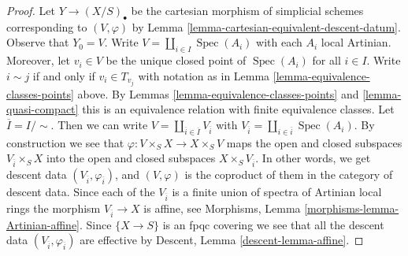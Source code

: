 \documentclass{stacks-project}
\theoremstyle{plain}
\theoremstyle{definition}
\theoremstyle{remark}
\numberwithin{equation}{subsection}
\def\Spec{\mathop{\mathrm{Spec}}}
\begin{document}
\begin{proof}
Let $Y \to (X/S)_\bullet$ be the cartesian morphism of simplicial
schemes corresponding to $(V, \varphi)$ by
Lemma \ref{lemma-cartesian-equivalent-descent-datum}.
Observe that $Y_0 = V$.
Write $V = \coprod_{i \in I} \Spec(A_i)$ with each $A_i$ local
Artinian. Moreover, let $v_i \in V$ be the unique closed point of
$\Spec(A_i)$ for all $i \in I$. Write $i \sim j$ if and only if
$v_i \in T_{v_j}$ with notation as in
Lemma \ref{lemma-equivalence-classes-points} above.
By Lemmas \ref{lemma-equivalence-classes-points} and \ref{lemma-quasi-compact}
this is an equivalence relation with finite equivalence
classes. Let $\overline{I} = I/\sim$. Then we can write
$V = \coprod_{\overline{i} \in \overline{I}} V_{\overline{i}}$
with
$V_{\overline{i}} = \coprod_{i \in \overline{i}} \Spec(A_i)$.
By construction we see that
$\varphi : V \times_S X \to X \times_S V$ maps
the open and closed subspaces $V_{\overline{i}} \times_S X$
into the open and closed subspaces $X \times_S V_{\overline{i}}$.
In other words, we get descent data
$(V_{\overline{i}}, \varphi_{\overline{i}})$, and
$(V, \varphi)$ is the coproduct of them in the category of
descent data.
Since each of the $V_{\overline{i}}$ is a finite union of
spectra of Artinian local rings the morphism $V_{\overline{i}} \to X$
is affine, see Morphisms, Lemma \ref{morphisms-lemma-Artinian-affine}.
Since $\{X \to S\}$ is an fpqc covering we see that all
the descent data $(V_{\overline{i}}, \varphi_{\overline{i}})$ are effective
by Descent, Lemma \ref{descent-lemma-affine}.
\end{proof}
\end{document}
